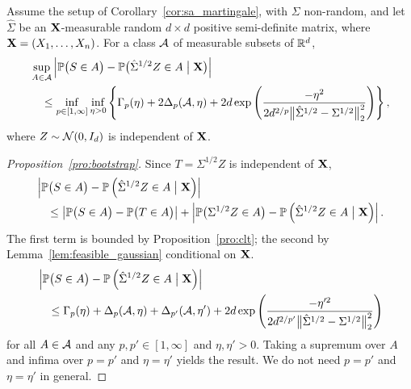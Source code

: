 \begin{proposition}%
  \label{pro:bootstrap}

  Assume the setup of Corollary~\ref{cor:sa_martingale},
  with $\Sigma$ non-random,
  and let $\hat \Sigma$ be an $\mathbf{X}$-measurable random
  $d \times d$ positive semi-definite matrix,
  where $\mathbf{X} = (X_1, \ldots, X_n)$.
  For a class $\mathcal{A}$ of measurable subsets of $\mathbb{R}^d$,
  \begin{align*}
    &\sup_{A\in \mathcal{A}}
    \left|
    \mathbb{P}\big(S \in A\big)
    - \mathbb{P}\big(\hat \Sigma^{1/2} Z \in A \bigm| \mathbf{X} \big)
    \right| \\
    &\quad\leq
    \inf_{p \in [1,\infty]} \inf_{\eta>0}
    \left\{ \Gamma_p(\eta) + 2 \Delta_p(\mathcal{A}, \eta)
      + 2d \exp\left(\frac{-\eta^2}
        {2d^{2/p}\big\|\hat \Sigma^{1/2} - \Sigma^{1/2}\big\|_2^2}
      \right)
    \right\},
  \end{align*}
  where $Z \sim \mathcal{N}(0,I_d)$ is independent of $\mathbf{X}$.
\end{proposition}

\begin{proof}[Proposition~\ref{pro:bootstrap}]

  Since $T = \Sigma^{1/2} Z$ is independent of $\mathbf{X}$,
  \begin{align*}
    &\left|
    \mathbb{P}\big(S \in A\big)
    - \mathbb{P}\left(\hat \Sigma^{1/2} Z \in A \bigm| \mathbf{X}\right)
    \right| \\
    &\quad\leq
    \left|
    \mathbb{P}\big(S \in A\big)
    - \mathbb{P}\big(T \in A\big)
    \right|
    +\left|
    \mathbb{P}\big(\Sigma^{1/2} Z \in A\big)
    - \mathbb{P}\left(\hat \Sigma^{1/2} Z \in A \bigm| \mathbf{X}\right)
    \right|.
  \end{align*}
  The first term is bounded by Proposition~\ref{pro:clt};
  the second by Lemma~\ref{lem:feasible_gaussian}
  conditional on $\mathbf{X}$.
  \begin{align*}
    &\left|
    \mathbb{P}\big(S \in A\big)
    - \mathbb{P}\left(\hat \Sigma^{1/2} Z \in A \bigm| \mathbf{X}\right)
    \right| \\
    &\quad\leq
    \Gamma_p(\eta) + \Delta_p(\mathcal{A}, \eta)
    + \Delta_{p'}(\mathcal{A}, \eta')
    + 2 d \exp \left( \frac{-\eta'^2}
      {2 d^{2/p'} \big\|\hat\Sigma^{1/2} - \Sigma^{1/2}\big\|_2^2}
    \right)
  \end{align*}
  for all $A \in \mathcal{A}$
  and any $p, p' \in [1, \infty]$ and $\eta, \eta' > 0$.
  Taking a supremum over $A$ and infima over
  $p = p'$ and $\eta = \eta'$ yields the result.
  We do not need
  $p = p'$ and $\eta = \eta'$ in general.
\end{proof}

